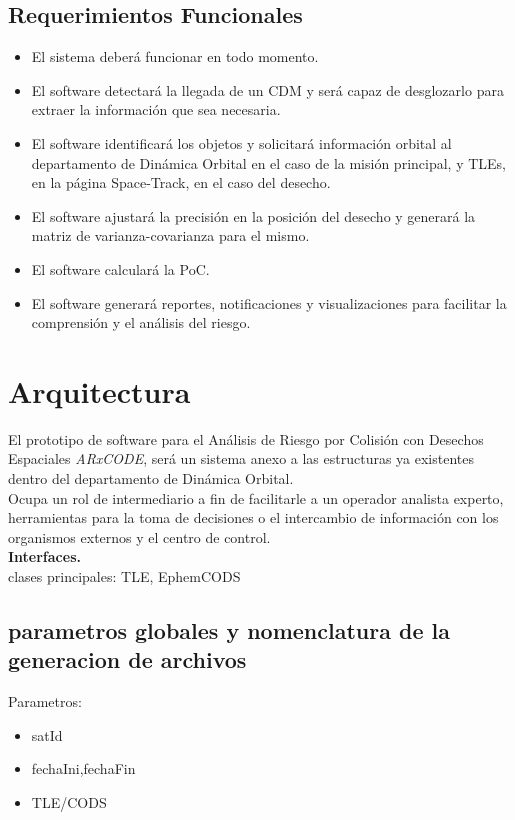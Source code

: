 \subsection*{Requerimientos Funcionales}
\begin{itemize}
\item El sistema deber\'a funcionar en todo momento.\\
\item El software detectar\'a la llegada de un CDM y ser\'a capaz de desglozarlo para extraer la informaci\'on que sea necesaria.\\
\item El software identificar\'a los objetos y solicitar\'a informaci\'on orbital al departamento de Din\'amica Orbital en el caso de la misi\'on principal, y TLEs, en la p\'agina Space-Track, en el caso del desecho.\\
\item El software ajustar\'a la precisi\'on en la posici\'on del desecho y generar\'a la matriz de varianza-covarianza para el mismo.\\
\item El software calcular\'a la PoC.\\
\item El software generar\'a reportes, notificaciones y visualizaciones para facilitar la comprensi\'on y el an\'alisis del riesgo.
\end{itemize}



\section{Arquitectura}
El prototipo de software para el An\'alisis de Riesgo por Colisi\'on con Desechos Espaciales {\it{ARxCODE}}, ser\'a un sistema anexo a las estructuras ya existentes dentro del departamento de Din\'amica Orbital.\\
Ocupa un rol de intermediario a fin de facilitarle a un operador analista experto, herramientas para la toma de decisiones o el intercambio de informaci\'on con los organismos externos y el centro de control.\\
{\bf{Interfaces.}}\\
clases principales: TLE, EphemCODS
\subsection*{parametros globales y nomenclatura de la generacion de archivos}
Parametros:\\
\begin{itemize}
 \item satId
 \item fechaIni,fechaFin
 \item TLE/CODS
\end{itemize}

